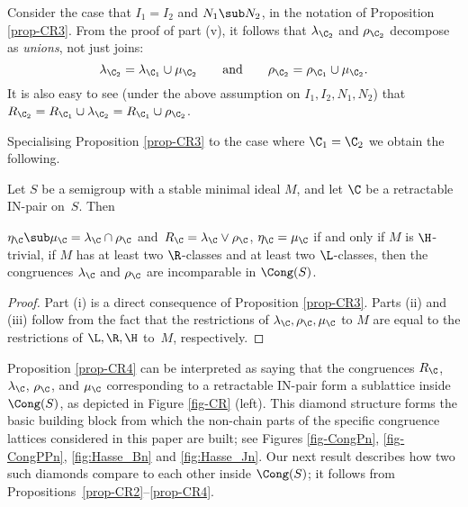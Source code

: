 \begin{rem}\label{rem:nonprincipal}
Consider the case that $I_1=I_2$ and $N_1\sub N_2$, in the notation of Proposition \ref{prop-CR3}.  From the proof of part (v), it follows that $\lambda_{\C_2}$ and $\rho_{\C_2}$ decompose as \emph{unions}, not just joins:
\[
\lambda_{\C_2} = \lambda_{\C_1}\cup\mu_{\C_2} \qquad\text{and}\qquad \rho_{\C_2} = \rho_{\C_1}\cup\mu_{\C_2}.
\]
It is also easy to see (under the above assumption on $I_1,I_2,N_1,N_2$) that $R_{\C_2}=R_{\C_1}\cup\lambda_{\C_2}=R_{\C_1}\cup\rho_{\C_2}$.
\end{rem}

Specialising Proposition \ref{prop-CR3} to the case where $\C_1=\C_2$ we obtain
the following.

\begin{proposition}
\label{prop-CR4}
Let $S$ be a semigroup with a stable minimal ideal $M$, and let $\C$ be a retractable IN-pair on~$S$.  Then
\begin{itemize}
 $\eta_\C\sub\mu_\C=\lambda_{\C}\cap \rho_{\C}$ and~$R_\C=\lambda_{\C}\vee \rho_{\C}$,
 $\eta_\C=\mu_\C$ if and only if $M$ is $\H$-trivial,
 if $M$ has at least two $\R$-classes and at least two $\L$-classes, then the congruences $\lambda_{\C}$ and $\rho_{\C}$ are incomparable in $\Cong(S)$.
\end{itemize}
\end{proposition}

\begin{proof} Part (i) is a direct consequence of Proposition \ref{prop-CR3}.  Parts (ii) and (iii) follow from the fact that the restrictions of $\lambda_\C,\rho_\C,\mu_\C$ to $M$ are equal to the restrictions of $\L,\R,\H$ to~$M$, respectively. \end{proof}

Proposition \ref{prop-CR4} can be interpreted as saying that the congruences
$R_{\C}$, $\lambda_{\C}$, $\rho_{\C}$, and $\mu_{\C}$ corresponding to a
retractable IN-pair form a sublattice inside $\Cong(S)$, as
depicted in Figure \ref{fig-CR} (left).
This diamond structure forms the basic building block from which the
non-chain parts of the specific congruence lattices considered in this paper are
built; see Figures \ref{fig-CongPn}, \ref{fig-CongPPn}, \ref{fig:Hasse_Bn} and
\ref{fig:Hasse_Jn}. Our next result describes how two such diamonds compare to
each other inside $\Cong(S)$; it follows from Propositions~\ref{prop-CR2}--\ref{prop-CR4}.


